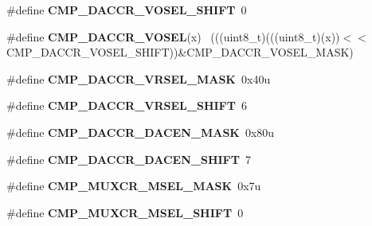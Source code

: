 \begin{DoxyCompactItemize}
\item 
\hypertarget{group___c_m_p___register___masks_ga329adee42ffc5125d3a6a85c6b990311}{}\#define {\bfseries C\+M\+P\+\_\+\+D\+A\+C\+C\+R\+\_\+\+V\+O\+S\+E\+L\+\_\+\+S\+H\+I\+F\+T}~0\label{group___c_m_p___register___masks_ga329adee42ffc5125d3a6a85c6b990311}

\item 
\hypertarget{group___c_m_p___register___masks_ga7bc3c08fb7b5c8d02b7c1beac42323cb}{}\#define {\bfseries C\+M\+P\+\_\+\+D\+A\+C\+C\+R\+\_\+\+V\+O\+S\+E\+L}(x)                                          ~(((uint8\+\_\+t)(((uint8\+\_\+t)(x))$<$$<$C\+M\+P\+\_\+\+D\+A\+C\+C\+R\+\_\+\+V\+O\+S\+E\+L\+\_\+\+S\+H\+I\+F\+T))\&C\+M\+P\+\_\+\+D\+A\+C\+C\+R\+\_\+\+V\+O\+S\+E\+L\+\_\+\+M\+A\+S\+K)\label{group___c_m_p___register___masks_ga7bc3c08fb7b5c8d02b7c1beac42323cb}

\item 
\hypertarget{group___c_m_p___register___masks_gac9eceaf5b3e478eb1a332681c8bcf160}{}\#define {\bfseries C\+M\+P\+\_\+\+D\+A\+C\+C\+R\+\_\+\+V\+R\+S\+E\+L\+\_\+\+M\+A\+S\+K}~0x40u\label{group___c_m_p___register___masks_gac9eceaf5b3e478eb1a332681c8bcf160}

\item 
\hypertarget{group___c_m_p___register___masks_gab9f804a9c4ecafbaaa82f2fc0ec69083}{}\#define {\bfseries C\+M\+P\+\_\+\+D\+A\+C\+C\+R\+\_\+\+V\+R\+S\+E\+L\+\_\+\+S\+H\+I\+F\+T}~6\label{group___c_m_p___register___masks_gab9f804a9c4ecafbaaa82f2fc0ec69083}

\item 
\hypertarget{group___c_m_p___register___masks_gacfd8aec2de81865d8f5fc0f06d17ba08}{}\#define {\bfseries C\+M\+P\+\_\+\+D\+A\+C\+C\+R\+\_\+\+D\+A\+C\+E\+N\+\_\+\+M\+A\+S\+K}~0x80u\label{group___c_m_p___register___masks_gacfd8aec2de81865d8f5fc0f06d17ba08}

\item 
\hypertarget{group___c_m_p___register___masks_ga85aa1686a0d5a7de2375bfab7167bb93}{}\#define {\bfseries C\+M\+P\+\_\+\+D\+A\+C\+C\+R\+\_\+\+D\+A\+C\+E\+N\+\_\+\+S\+H\+I\+F\+T}~7\label{group___c_m_p___register___masks_ga85aa1686a0d5a7de2375bfab7167bb93}

\item 
\hypertarget{group___c_m_p___register___masks_ga6ff83366097d3be5ae93234b68684cf5}{}\#define {\bfseries C\+M\+P\+\_\+\+M\+U\+X\+C\+R\+\_\+\+M\+S\+E\+L\+\_\+\+M\+A\+S\+K}~0x7u\label{group___c_m_p___register___masks_ga6ff83366097d3be5ae93234b68684cf5}

\item 
\hypertarget{group___c_m_p___register___masks_gad74d8206afe9b7ad009b0a7ac2bbf1cf}{}\#define {\bfseries C\+M\+P\+\_\+\+M\+U\+X\+C\+R\+\_\+\+M\+S\+E\+L\+\_\+\+S\+H\+I\+F\+T}~0\label{group___c_m_p___register___masks_gad74d8206afe9b7ad009b0a7ac2bbf1cf}


\end{DoxyCompactItemize}

